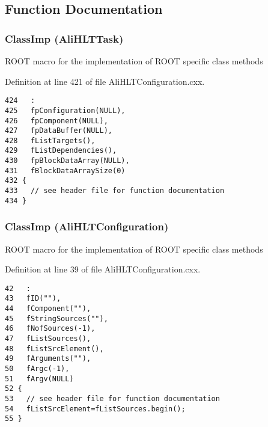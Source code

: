 \subsection{Function Documentation}
\subsubsection{\setlength{\rightskip}{0pt plus 5cm}Class\-Imp ({\bf Ali\-HLTTask})}\label{AliHLTConfiguration_8cxx_a1}


ROOT macro for the implementation of ROOT specific class methods 

Definition at line 421 of file Ali\-HLTConfiguration.cxx.

\footnotesize\begin{verbatim}424   :
425   fpConfiguration(NULL),
426   fpComponent(NULL),
427   fpDataBuffer(NULL),
428   fListTargets(),
429   fListDependencies(),
430   fpBlockDataArray(NULL),
431   fBlockDataArraySize(0)
432 {
433   // see header file for function documentation
434 }

\end{verbatim}\normalsize 


\subsubsection{\setlength{\rightskip}{0pt plus 5cm}Class\-Imp ({\bf Ali\-HLTConfiguration})}\label{AliHLTConfiguration_8cxx_a0}


ROOT macro for the implementation of ROOT specific class methods 

Definition at line 39 of file Ali\-HLTConfiguration.cxx.

\footnotesize\begin{verbatim}42   :
43   fID(""),
44   fComponent(""),
45   fStringSources(""),
46   fNofSources(-1),
47   fListSources(),
48   fListSrcElement(),
49   fArguments(""),
50   fArgc(-1),
51   fArgv(NULL)
52 { 
53   // see header file for function documentation
54   fListSrcElement=fListSources.begin();
55 }

\end{verbatim}\normalsize 


